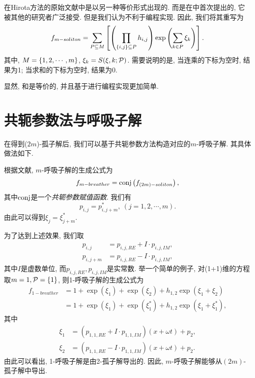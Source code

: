 在Hirota方法的原始文献\cite{hirota1971exact}中是以另一种等价形式出现的. 而是在中首次提出的, 它被其他的研究者广泛接受. 但是我们认为不利于编程实现. 因此, 我们将其重写为
\begin{equation}
    f_{m-soliton}=\sum_{P\subseteq M}\left[\left(\prod_{\left\{i,j\right\}\subseteq P}{h_{i,j}}\right)\exp\left(\sum_{k\in P}{\xi_k}\right)\right]. \label{f-soliton-new}
\end{equation}
其中, $M=\left\{1,2,\cdots,m\right\}$, $\xi_k=S(\xi,k;\mathcal{P})$. 需要说明的是, 当连乘的下标为空时, 结果为1; 当求和的下标为空时, 结果为0. 

显然, 和是等价的, 并且基于进行编程实现更加简单.

\section{共轭参数法与呼吸子解}
在得到($2m$)-孤子解后, 我们可以基于共轭参数方法构造对应的$m$-呼吸子解. 其具体做法如下.

根据文献\cite{tajiri1989breather}, $m$-呼吸子解的生成公式为
\begin{equation}
    f_{m-breather}={\rm conj}\left(f_{(2m)-soliton}\right), \label{f-breather}
\end{equation}
其中${\rm conj}$是一个\emph{共轭参数赋值函数}. 我们有 
\begin{equation}
    p_{i,j}=p_{i,j+m}^*,~(j=1,2,\cdots,m).
\end{equation}
由此可以得到$\xi_{j}=\xi_{j+m}^*$. 

为了达到上述效果, 我们取
\begin{equation}
\begin{split}
    p_{i,j}&=p_{i,j,RE}+I\cdot p_{i,j,IM}, \\ 
    p_{i,j+m}&=p_{i,j,RE}-I\cdot p_{i,j,IM},
\end{split}
\end{equation}
其中$I$是虚数单位, 而$p_{i,j,RE},p_{i,j,IM}$是实常数. 举一个简单的例子, 对(1+1)维的方程取$m=1,\mathcal{P}=\left\{1\right\}$, 则1-呼吸子解的生成公式为
\begin{equation}
\begin{split}
f_{1-breather}&=1+\exp(\xi_1)+\exp(\xi_2)+h_{1,2}\exp(\xi_1+\xi_2) \\ 
&=1+\exp(\xi_1)+\exp(\xi_1^*)+h_{1,2}\exp(\xi_1+\xi_1^*),
\end{split}
\end{equation}
其中
\begin{equation}
\begin{split}
\xi_1&=(p_{1,1,RE}+I\cdot p_{1,1,IM})(x+\omega t)+p_{2}, \\ 
\xi_2&=(p_{1,1,RE}-I\cdot p_{1,1,IM})(x+\omega t)+p_{2}.
\end{split}    
\end{equation}
由此可以看出, 1-呼吸子解是由2-孤子解导出的. 因此, $m$-呼吸子解能够从$(2m)$-孤子解中导出.

